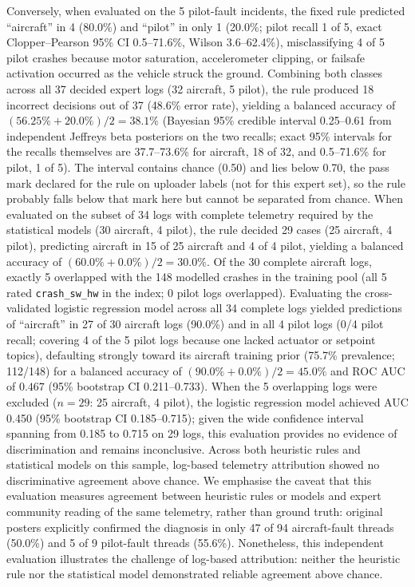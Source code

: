\documentclass[preprint,12pt]{elsarticle}
\begin{document}
Conversely, when evaluated on the 5 pilot-fault incidents, the fixed rule predicted ``aircraft'' in 4 (80.0\%) and ``pilot'' in only 1 (20.0\%;
pilot recall 1 of 5, exact Clopper--Pearson 95\% CI 0.5--71.6\%, Wilson 3.6--62.4\%), misclassifying 4 of 5 pilot crashes because motor saturation,
accelerometer clipping, or failsafe activation occurred as the vehicle struck the ground. Combining both classes across all 37 decided expert logs
(32 aircraft, 5 pilot), the rule produced 18 incorrect decisions out of 37 (48.6\% error rate), yielding a balanced accuracy of
$(56.25\% + 20.0\%) / 2 = 38.1\%$ (Bayesian 95\% credible interval 0.25--0.61 from independent Jeffreys beta posteriors on the two recalls; exact 95\% intervals for the recalls themselves are 37.7--73.6\% for aircraft, 18 of 32, and 0.5--71.6\% for pilot, 1 of 5). The interval contains chance (0.50) and lies below 0.70, the pass mark declared for the rule on uploader labels (not for this expert set), so the rule probably falls below that mark here but cannot be separated from chance. When evaluated on the subset of 34 logs with complete telemetry required by the statistical models (30 aircraft, 4 pilot), the rule decided 29 cases (25 aircraft, 4 pilot), predicting aircraft in 15 of 25 aircraft and 4 of 4 pilot, yielding a balanced accuracy of $(60.0\% + 0.0\%) / 2 = 30.0\%$. Of the 30 complete aircraft logs, exactly 5 overlapped with the 148 modelled crashes in the training pool (all 5 rated \texttt{crash\_sw\_hw} in the index; 0 pilot logs overlapped). Evaluating the cross-validated logistic regression model across all 34 complete logs yielded predictions of ``aircraft'' in 27 of 30 aircraft logs (90.0\%) and in all 4 pilot logs (0/4 pilot recall; covering 4 of the 5 pilot logs because one lacked actuator or setpoint topics), defaulting strongly toward its aircraft training prior (75.7\% prevalence; 112/148) for a balanced accuracy of $(90.0\% + 0.0\%) / 2 = 45.0\%$ and ROC AUC of $0.467$ (95\% bootstrap CI 0.211--0.733). When the 5 overlapping logs were excluded ($n=29$: 25 aircraft, 4 pilot), the logistic regression model achieved AUC 0.450 (95\% bootstrap CI 0.185--0.715); given the wide confidence interval spanning from 0.185 to 0.715 on 29 logs, this evaluation provides no evidence of discrimination and remains inconclusive. Across both heuristic rules and statistical models on this sample, log-based telemetry attribution showed no discriminative agreement above chance. We emphasise the caveat
that this evaluation measures agreement between heuristic rules or models and expert community reading of the same telemetry, rather than ground truth:
original posters explicitly confirmed the diagnosis in only 47 of 94 aircraft-fault threads (50.0\%) and 5 of 9 pilot-fault threads (55.6\%).
Nonetheless, this independent evaluation illustrates the challenge of log-based attribution: neither the heuristic rule nor the statistical model demonstrated reliable agreement above chance.
\end{document}
